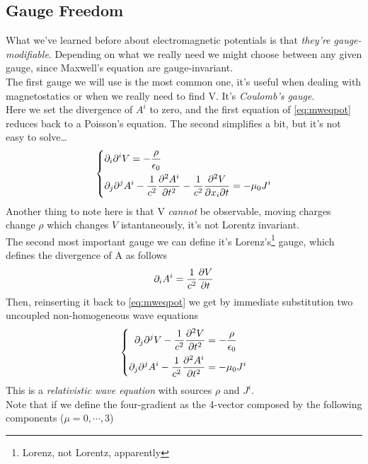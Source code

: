 \documentclass[../electromagnetism.tex]{subfiles}
\begin{document}
\subsection{Gauge Freedom}
What we've learned before about electromagnetic potentials is that \textit{they're gauge-modifiable}. Depending on what we really need we might choose between any given gauge, since Maxwell's equation are gauge-invariant.\\
The first gauge we will use is the most common one, it's useful when dealing with magnetostatics or when we really need to find V. It's \textit{Coulomb's gauge}.\\
Here we set the divergence of $A^i$ to zero, and the first equation of \eqref{eq:mweqpot} reduces back to a Poisson's equation. The second simplifies a bit, but it's not easy to solve\ldots
\begin{equation}
	\left\{ \begin{aligned}
			&\partial_i\partial^iV=-\frac{\rho}{\epsilon_0}\\
			&\partial_j\partial^jA^i-\frac{1}{c^2}\pdv[2]{A^i}{t}-\frac{1}{c^2}\pdv[2]{V}{x_i}{t}=-\mu_0J^i
	\end{aligned}\right.
	\label{eq:mweqpotcoulombg}
\end{equation}
Another thing to note here is that V \emph{cannot} be observable, moving charges change $\rho$ which changes $V$ istantaneously, it's not Lorentz invariant.\\
The second most important gauge we can define it's Lorenz's\footnote{Lorenz, not Lorentz, apparently} gauge, which defines the divergence of A as follows
\begin{equation}
	\partial_iA^i=\frac{1}{c^2}\pdv{V}{t}
	\label{eq:lorenzgauge-mwpot}
\end{equation}
Then, reinserting it back to \eqref{eq:mweqpot} we get by immediate substitution two uncoupled non-homogeneous wave equations
\begin{equation}
	\left\{\begin{aligned}
		\partial_j\partial^jV-\frac{1}{c^2}\pdv[2]{V}{t}&=-\frac{\rho}{\epsilon_0}\\
		\partial_j\partial^jA^i-\frac{1}{c^2}\pdv[2]{A^i}{t}&=-\mu_0J^i\\
	\end{aligned}\right.
	\label{eq:relwaveeq}
\end{equation}
This is a \textit{relativistic wave equation} with sources $\rho$ and $J^i$.\\
Note that if we define the four-gradient as the 4-vector composed by the following components ($\mu=0,\cdots,3$)
\end{document}
